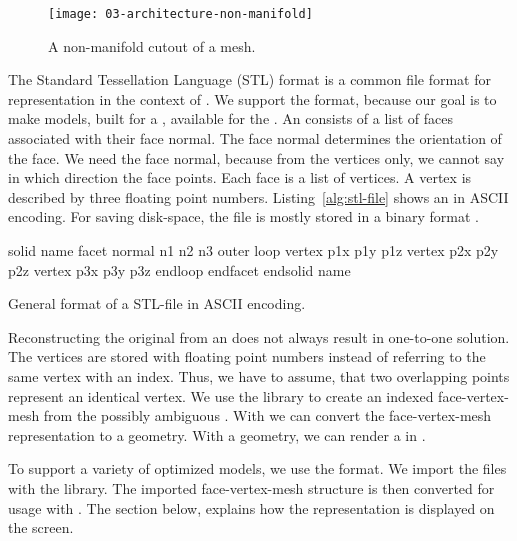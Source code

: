 \documentclass[../ClassicThesis.tex]{subfiles}
\begin{document}

\begin{figure}[h]
  \centering
  \texttt{[image: 03-architecture-non-manifold]}
  \caption{A non-manifold cutout of a mesh.}
  \label{fig:non-manifold}
\end{figure}

The Standard Tessellation Language (STL) format is a common file
format for {\threedmodel} representation in the context of
{\threedprinting}. We support the {\stlfile} format, because our goal
is to make models, built for a {\threedprinter}, available for the
{\lasercutter}. An {\stlfile} consists of a list of faces associated
with their face normal. The face normal determines the orientation of
the face. We need the face normal, because from the vertices only, we
cannot say in which direction the face points. Each face is a list of
vertices. A vertex is described by three floating point numbers.
Listing~\ref{alg:stl-file} shows an {\stlfile} in ASCII encoding. For
saving disk-space, the file is mostly stored in a binary format
\cite[p.~8]{stl-file}.

\begin{listing}
\centering
\begin{CVerbatim}
solid name
 facet normal n1 n2 n3
  outer loop
   vertex p1x p1y p1z
   vertex p2x p2y p2z
   vertex p3x p3y p3z
  endloop
 endfacet
endsolid name
\end{CVerbatim}
\caption{General format of a STL-file in ASCII encoding.}
\label{alg:stl-file}
\end{listing}

Reconstructing the original {\threedmodel} from an {\stlfile} does not
always result in one-to-one solution. The vertices are stored with
floating point numbers instead of referring to the same vertex with an
index. Thus, we have to assume, that two overlapping points represent
an identical vertex. We use the library {\meshlib} to create an
indexed face-vertex-mesh from the possibly ambiguous {\stlfile}. With
{\meshlib} we can convert the face-vertex-mesh representation to a
{\threejs} geometry. With a {\threejs} geometry, we can render a
{\threedmodel} in {\convertify}.

To support a variety of {\threedprinter} optimized models, we use the
{\stlfile} format. We import the files with the {\meshlib} library.
The imported face-vertex-mesh structure is then converted for usage
with {\threejs}. The section below, explains how the {\threejs}
representation is displayed on the screen.
\end{document}
